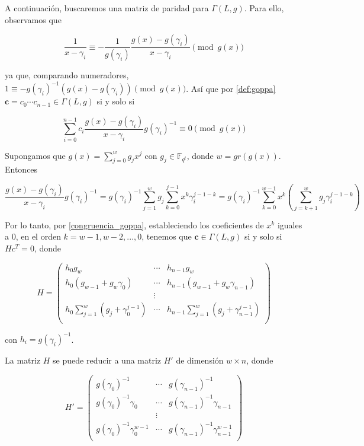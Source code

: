 A continuación, buscaremos una matriz de paridad para $\Gamma(L,g)$. Para ello, observamos que

$$\frac{1}{x - \gamma_i} \equiv - \frac{1}{g(\gamma_i)} \frac{g(x) - g(\gamma_i)}{x - \gamma_i} \pmod{ g(x)}$$

ya que, comparando numeradores, $1 \equiv - g(\gamma_i)^{-1} \left( g(x) - g(\gamma_i) \right) \pmod{g(x)}$. Así que por \eqref{def:goppa} $\textbf{c} = c_0 \cdots c_{n-1} \in \Gamma(L,g)$ si y solo si

\begin{equation}
    \label{congruencia_goppa}
    \sum_{i=0}^{n-1} c_i \frac{g(x) - g(\gamma_i)}{x - \gamma_i} g(\gamma_i)^{-1} \equiv 0 \pmod{g(x)}
\end{equation}

Supongamos que $g(x) = \sum_{j=0}^w g_j x^j$ con $g_j \in \mathbb{F}_{q^t}$, donde $w = gr(g(x))$. Entonces

$$\frac{g(x) - g(\gamma_i)}{x - \gamma_i} g(\gamma_i)^{-1} = g(\gamma_i)^{-1} \sum_{j=1}^w g_j \sum_{k=0}^{j-1} x^k \gamma_i^{j-1-k} = g(\gamma_i)^{-1} \sum_{k=0}^{w-1} x^k \left( \sum_{j=k+1}^w g_j \gamma_i^{j-1-k} \right)$$

Por lo tanto, por \eqref{congruencia_goppa}, estableciendo los coeficientes de $x^k$ iguales a $0$, en el orden $k = w - 1, w - 2, ..., 0$, tenemos que $\textbf{c} \in \Gamma(L,g)$ si y solo si $Hc^T = 0$, donde 

\begin{equation}
    H = \left(
        \begin{array}{ccc} 
            h_0 g_w & \cdots & h_{n-1} g_w  \\
            h_0 (g_{w-1} + g_w \gamma_0) & \cdots & h_{n-1} (g_{w-1} + g_w \gamma_{n-1}) \\
            & \vdots & \\
            h_0 \sum_{j=1}^w \left( g_j + \gamma_0^{j-1} \right) & \cdots & h_{n-1} \sum_{j=1}^w \left( g_{j} + \gamma_{n-1}^{j-1} \right) \\
        \end{array}
        \right)
\end{equation}

con $h_i = g(\gamma_i)^{-1}$.

\begin{proposition}
    La matriz $H$ se puede reducir a una matriz $H'$ de dimensión $w \times n$, donde 

    \begin{equation}
        H' = \left(
            \begin{array}{ccc} 
                g(\gamma_0)^{-1} & \cdots & g(\gamma_{n-1})^{-1}  \\
                g(\gamma_0)^{-1} \gamma_0 & \cdots & g(\gamma_{n-1})^{-1} \gamma_{n-1} \\
                & \vdots & \\
                g(\gamma_0)^{-1} \gamma_0^{w-1} & \cdots & g(\gamma_{n-1})^{-1} \gamma_{n-1}^{w-1} \\
            \end{array}
            \right)
    \end{equation}
\end{proposition}

